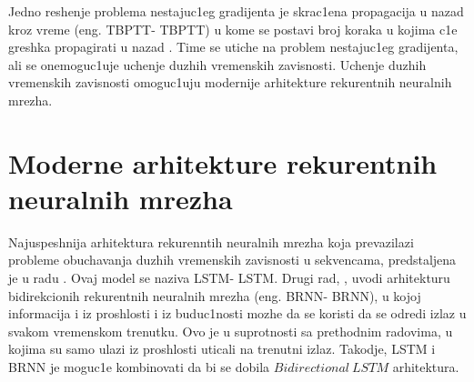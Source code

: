 \documentclass[a4paper, openany, oneside, 11pt]{book}
\begin{document}
Jedno reshenje problema nestajuc1eg gradijenta je skrac1ena propagacija u nazad kroz vreme (eng. \acrlong{TBPTT}- \acrshort{TBPTT}) u kome se postavi broj koraka u kojima c1e greshka propagirati u nazad \cite{TBPTT}. Time se utiche na problem nestajuc1eg gradijenta, ali se onemoguc1uje uchenje duzhih vremenskih zavisnosti. Uchenje duzhih vremenskih zavisnosti omoguc1uju modernije arhitekture rekurentnih neuralnih mrezha.
\section{Moderne arhitekture rekurentnih neuralnih mrezha}
Najuspeshnija arhitektura rekurenntih neuralnih mrezha koja prevazilazi probleme obuchavanja duzhih vremenskih zavisnosti u sekvencama, predstaljena je u radu \cite{LSTM}. Ovaj model se naziva \acrlong{LSTM}- \acrshort{LSTM}. Drugi rad, \cite{BLSTM}, uvodi arhitekturu bidirekcionih rekurentnih neuralnih mrezha (eng. \acrlong{BRNN}- \acrshort{BRNN}), u kojoj informacija i iz proshlosti i iz buduc1nosti mozhe da se koristi da se odredi izlaz u svakom vremenskom trenutku. Ovo je u suprotnosti sa prethodnim radovima, u kojima su samo ulazi iz pro\-shlosti uticali na trenutni izlaz. Takodje, \acrshort{LSTM} i \acrshort{BRNN} je moguc1e kombinovati da bi se dobila $Bidirectional\ LSTM$ arhitektura.
\end{document}
